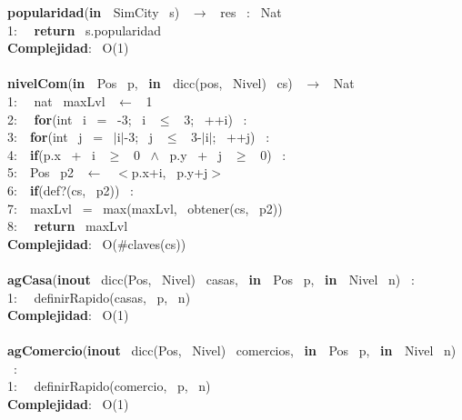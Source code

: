 \noindent\makebox[\linewidth]{\rule{\textwidth}{0.4pt}}
\textbf{popularidad}(\textbf{in \ }SimCity \ s) \ $\rightarrow $ \ res \ : \ Nat\\
1: \  \ \textbf{return} \ s.popularidad\\
\textbf{Complejidad}: \ O(1)\\
\noindent\makebox[\linewidth]{\rule{\textwidth}{0.4pt}}
\\
\noindent\makebox[\linewidth]{\rule{\textwidth}{0.4pt}}
\textbf{nivelCom}(\textbf{in \ }Pos \ p, \ \textbf{in \ }dicc(pos, \ Nivel) \ cs) \ $\rightarrow $ \ Nat\\
1: \  \ nat \ maxLvl \ $\leftarrow$ \ 1\\
2: \  \ \textbf{for}(int \ i \ = \ -3; \ i \ $\leq$ \ 3; \ ++i) \ :\\
3:\indent  \  \ \textbf{for}(int \ j \ = \ $\mid$i$\mid$-3; \ j \ $\leq$ \ 3-$\mid$i$\mid$; \ ++j) \ :\\
4:\indent \indent  \  \ \textbf{if}(p.x \ + \ i \ $\geq$ \ 0 \ $\wedge$ \ p.y \ + \ j \ $\geq$ \ 0) \ :\\
5:\indent \indent \indent  \  \ Pos \ p2 \ $\leftarrow$ \ $<$p.x+i, \ p.y+j$>$ \ \\
6:\indent \indent \indent  \  \ \textbf{if}(def?(cs, \ p2)) \ :\\
7:\indent \indent \indent \indent  \  \ maxLvl \ = \ max(maxLvl, \ obtener(cs, \ p2))\\
8: \  \ \textbf{return} \ maxLvl\\
\textbf{Complejidad}: \ O($ \# $claves(cs))\\
\noindent\makebox[\linewidth]{\rule{\textwidth}{0.4pt}}
\\
\noindent\makebox[\linewidth]{\rule{\textwidth}{0.4pt}}
\textbf{agCasa}(\textbf{inout} \ dicc(Pos, \ Nivel) \ casas, \ \textbf{in \ }Pos \ p, \ \textbf{in \ }Nivel \ n) \ :\\
1: \  \ definirRapido(casas, \ p, \ n)\\
\textbf{Complejidad}: \ O(1)\\
\noindent\makebox[\linewidth]{\rule{\textwidth}{0.4pt}}
\\
\noindent\makebox[\linewidth]{\rule{\textwidth}{0.4pt}}
\textbf{agComercio}(\textbf{inout} \ dicc(Pos, \ Nivel) \ comercios, \ \textbf{in \ }Pos \ p, \ \textbf{in \ }Nivel \ n) \ :\\
1: \  \ definirRapido(comercio, \ p, \ n)\\
\textbf{Complejidad}: \ O(1)\\
\noindent\makebox[\linewidth]{\rule{\textwidth}{0.4pt}}
